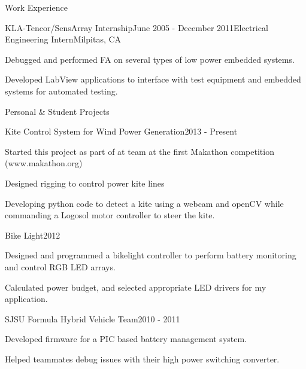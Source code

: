 \documentclass{resume} %
\begin{document}
\begin{rSection}{Work Experience}
\pagebreak[2]
\begin{rSubsection}{KLA-Tencor/SensArray Internship}{June 2005 - December 2011}{Electrical Engineering Intern}{Milpitas, CA}
\item Debugged and performed FA on several types of low power embedded systems. 
\item Developed LabView applications to interface with test equipment and embedded systems for automated testing.
\end{rSubsection}
\end{rSection}

\pagebreak[3]
\begin{rSection}{Personal \& Student Projects}

\vspace{-0.5em}
\begin{rProject}{Kite Control System for Wind Power Generation}{2013 - Present}
\item Started this project as part of at team at the first Makathon competition (www.makathon.org)
\item Designed rigging to control power kite lines 
\item Developing python code to detect a kite using a webcam and openCV while commanding a Logosol motor controller to steer the kite.
\end{rProject}

\vspace{-0.5em}
\begin{rProject}{Bike Light}{2012}
\item Designed and programmed a bikelight controller to perform battery monitoring and control RGB LED arrays.
\item Calculated power budget, and selected appropriate LED drivers for my application.
\end{rProject}
\vspace{-0.5em}

\begin{rProject}{SJSU Formula Hybrid Vehicle Team}{2010 - 2011}
\item Developed firmware for a PIC based battery management system.
\item Helped teammates debug issues with their high power switching converter.
\end{rProject}
\end{rSection}
\end{document}
